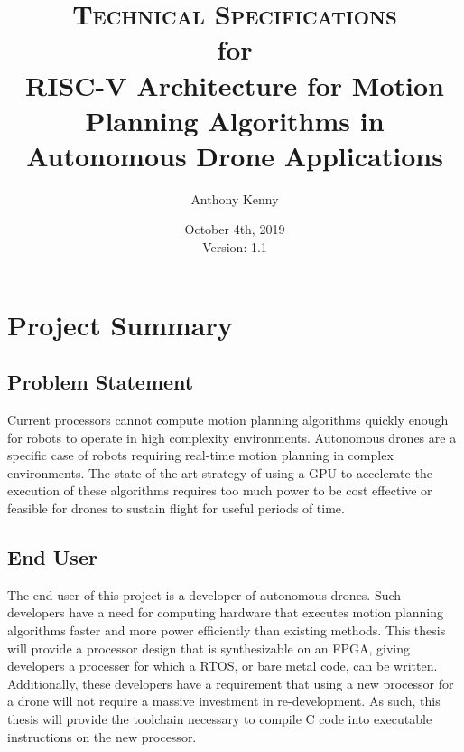 \documentclass[11pt, oneside]{article}      %
\title{\textsc{Technical Specifications} \\ 
	\small{for} \\ 
	\Large{RISC-V Architecture for Motion Planning Algorithms in Autonomous Drone Applications}}
\author{Anthony Kenny}
\date{October 4th, 2019 \\ 
	Version: 1.1}
\begin{document}
\maketitle


\section{Project Summary}


\subsection{Problem Statement}
Current processors cannot compute motion planning algorithms quickly enough for robots to operate in high complexity environments. Autonomous drones are a specific case of robots requiring real-time motion planning in complex environments. The state-of-the-art strategy of using a \ac{GPU} to accelerate the execution of these algorithms requires too much power to be cost effective or feasible for drones to sustain flight for useful periods of time.

\subsection{End User}
The end user of this project is a developer of autonomous drones. Such developers have a need for computing hardware that executes motion planning algorithms faster and more power efficiently than existing methods. This thesis will provide a processor design that is synthesizable on an \ac{FPGA}, giving developers a processer for which a \ac{RTOS}, or bare metal code, can be written. 
Additionally, these developers have a requirement that using a new processor for a drone will not require a massive investment in re-development. As such, this thesis will provide the toolchain necessary to compile C code into executable instructions on the new processor.
\end{document}
